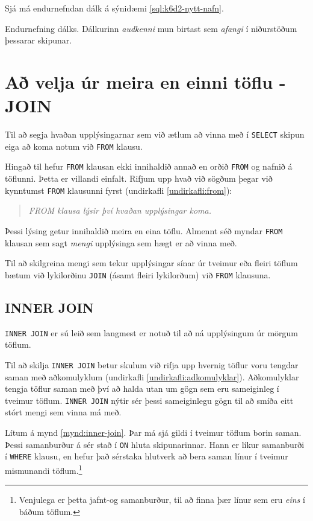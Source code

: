 Sjá má endurnefndan dálk á sýnidæmi \ref{sql:k6d2-nytt-nafn}.

\begin{example}
\caption[Endurnefning]{Endurnefning dálks. Dálkurinn \emph{audkenni} mun birtast sem \emph{afangi} í niðurstöðum þessarar skipunar.}
\label{sql:k6d2-nytt-nafn}
\centering
{}
\end{example}

\section{Að velja úr meira en einni töflu - JOIN}
Til að segja hvaðan upplýsingarnar sem við ætlum að vinna með í \verb|SELECT| skipun eiga að koma notum við \verb|FROM| klausu.

Hingað til hefur \verb|FROM| klausan ekki innihaldið annað en orðið \verb|FROM| og nafnið á töflunni. Þetta er villandi einfalt. Rifjum upp hvað við sögðum þegar við kynntumst \verb|FROM| klausunni fyrst (undirkafli \ref{undirkafli:from}):
\begin{quote}
\emph{FROM klausa lýsir því hvaðan upplýsingar koma.}
\end{quote}
Þessi lýsing getur innihaldið meira en eina töflu. Almennt séð myndar \verb|FROM| klausan sem sagt \emph{mengi} upplýsinga sem hægt er að vinna með.

Til að skilgreina mengi sem tekur upplýsingar sínar úr tveimur eða fleiri töflum bætum við lykilorðinu \verb|JOIN| (ásamt fleiri lykilorðum) við \verb|FROM| klausuna.

\subsection{INNER JOIN}
\verb|INNER JOIN| er sú leið sem langmest er notuð til að ná upplýsingum úr mörgum töflum. 

Til að skilja \verb|INNER JOIN| betur skulum við rifja upp hvernig töflur voru tengdar saman með aðkomulyklum (undirkafli \ref{undirkafli:adkomulyklar}).
Aðkomulyklar tengja töflur saman með því að halda utan um gögn sem eru sameiginleg í tveimur töflum. \verb|INNER JOIN| nýtir sér þessi sameiginlegu gögn til að smíða eitt stórt mengi sem vinna má með.

Lítum á mynd \ref{mynd:inner-join}. Þar má sjá gildi í tveimur töflum borin saman. Þessi samanburður á sér stað í \verb|ON| hluta skipunarinnar. Hann er líkur samanburði í \verb|WHERE| klausu, en hefur það sérstaka hlutverk að bera saman línur í tveimur mismunandi töflum.\footnote{Venjulega er þetta jafnt-og samanburður, til að finna þær línur sem eru \emph{eins} í báðum töflum.}


